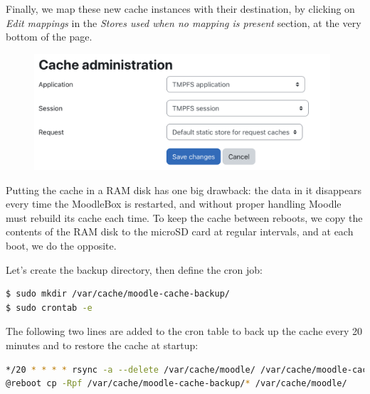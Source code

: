 \documentclass[12pt]{article}
\begin{document}
Finally, we map these new cache instances with their destination, by clicking on \emph{Edit mappings} in the \emph{Stores used when no mapping is present} section, at the very bottom of the page.

\begin{figure}[!ht]
\begin{minipage}[b]{\linewidth}
\centering
\includegraphics[width=11cm]{cache-mappings.png}
\end{minipage}
\end{figure}

Putting the cache in a RAM disk has one big drawback: the data in it disappears every time the MoodleBox is restarted, and without proper handling Moodle must rebuild its cache each time.
To keep the cache between reboots, we copy the contents of the RAM disk to the microSD card at regular intervals, and at each boot, we do the opposite.

Let's create the backup directory, then define the cron job:
\begin{lstlisting}[language=bash]
$ sudo mkdir /var/cache/moodle-cache-backup/
$ sudo crontab -e
\end{lstlisting}

The following two lines are added to the cron table to back up the cache every 20 minutes and to restore the cache at startup:
\begin{lstlisting}[language=bash]
*/20 * * * * rsync -a --delete /var/cache/moodle/ /var/cache/moodle-cache-backup/
@reboot cp -Rpf /var/cache/moodle-cache-backup/* /var/cache/moodle/
\end{lstlisting}
\end{document}
